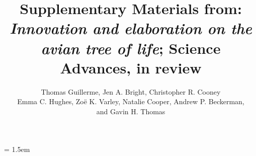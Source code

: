 \documentclass[12pt,a4paper]{article}
\title{Supplementary Materials from: \textit{Innovation and elaboration on the avian tree of life}; Science Advances, in review}
\author{Thomas Guillerme, 
Jen A. Bright,
Christopher R. Cooney\\
Emma C. Hughes,
Zo\"{e} K. Varley,
Natalie Cooper,
Andrew P. Beckerman,\\
and Gavin H. Thomas}
\date{}
\begin{document}
\maketitle

\tableofcontents

\parindent = 1.5em
\addtolength{\parskip}{.3em}


\newpage 

%
%


\end{document}

